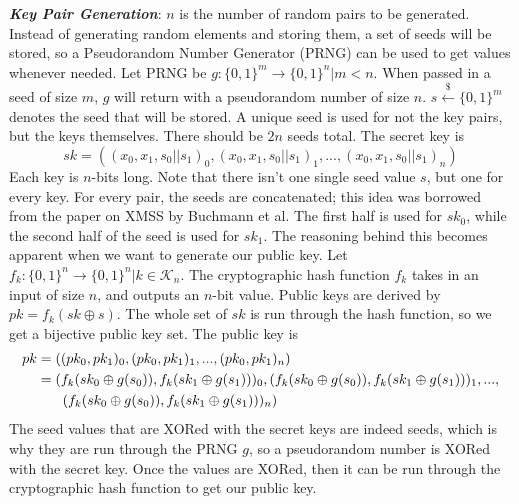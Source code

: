 \documentclass[]{scrartcl}
\makeatletter
\newcommand{\mathcenter}{\@fleqnfalse}
\makeatother
\begin{document}
\textbf{\textit{Key Pair Generation}}: $n$ is the number of random pairs to be generated. Instead of generating random elements and storing them, a set of seeds will be stored, so a Pseudorandom Number Generator (PRNG) can be used to get values whenever needed. Let PRNG be $g : \{0,1\}^m \rightarrow \{0,1\}^n | m < n$. When passed in a seed of size $m$, $g$ will return with a pseudorandom number of size $n$. $s \xleftarrow{\$} \{0,1\}^m$ denotes the seed that will be stored. A unique seed is used for not the key pairs, but the keys themselves. There should be $2n$ seeds total. The secret key is 
\mathcenter
\begin{equation}
sk = ((x_0, x_1, s_0||s_1)_0,(x_0, x_1, s_0||s_1)_1,...,(x_0, x_1, s_0||s_1)_n) 
\end{equation}
Each key is $n$-bits long. Note that there isn't one single seed value $s$, but one for every key. For every pair, the seeds are concatenated; this idea was borrowed from the paper on XMSS by Buchmann et al. The first half is used for $sk_0$, while the second half of the seed is used for $sk_1$. The reasoning behind this becomes apparent when we want to generate our public key. Let $f_k : \{0,1\}^n \rightarrow \{0,1\}^n | k \in \mathcal{K}_n$. The cryptographic hash function $f_k$ takes in an input of size $n$, and outputs an $n$-bit value. Public keys are derived by $pk = f_k(sk \oplus s)$. The whole set of $sk$ is run through the hash function, so we get a bijective public key set. The public key is
\mathcenter
\begin{equation}
	\begin{split}
		pk & = ((pk_0, pk_1)_0,(pk_0, pk_1)_1,...,(pk_0, pk_1)_n) \\
		& = (f_k(sk_0 \oplus g(s_0)), f_k(sk_1 \oplus g(s_1)))_0,(f_k(sk_0 \oplus g(s_0)), f_k(sk_1 \oplus g(s_1)))_1,...,\\
		& \hspace{0.65cm}(f_k(sk_0 \oplus g(s_0)), f_k(sk_1 \oplus g(s_1)))_n) 
	\end{split}
\end{equation}
The seed values that are XORed with the secret keys are indeed seeds, which is why they are run through the PRNG $g$, so a pseudorandom number is XORed with the secret key. Once the values are XORed, then it can be run through the cryptographic hash function to get our public key.\\ \\
\end{document}
